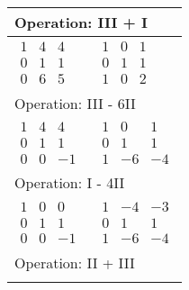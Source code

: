 \begin{longtable}{p{4cm}|p{3cm}}
    \multicolumn{2}{p{\dimexpr4cm+3cm+2\tabcolsep\relax}}{Operation: III + I} \\\hline\pagebreak[0]

    $\displaystyle\begin{matrix}
        1 & 4 & 4 \\
        0 & 1 & 1 \\
        0 & 6 & 5
    \end{matrix}$&
    $\displaystyle\begin{matrix}
        1 & 0 & 1 \\
        0 & 1 & 1 \\
        1 & 0 & 2
    \end{matrix}$\\\hline

    \multicolumn{2}{p{\dimexpr4cm+3cm+2\tabcolsep\relax}}{Operation: III - 6II} \\\hline\pagebreak[0]

    $\displaystyle\begin{matrix}
        1 & 4 & 4 \\
        0 & 1 & 1 \\
        0 & 0 & -1
    \end{matrix}$&
    $\displaystyle\begin{matrix}
        1 & 0 & 1 \\
        0 & 1 & 1 \\
        1 & -6 & -4
    \end{matrix}$\\\hline

    \multicolumn{2}{p{\dimexpr4cm+3cm+2\tabcolsep\relax}}{Operation: I - 4II} \\\hline\pagebreak[0]

    $\displaystyle\begin{matrix}
        1 & 0 & 0 \\
        0 & 1 & 1 \\
        0 & 0 & -1
    \end{matrix}$&
    $\displaystyle\begin{matrix}
        1 & -4 & -3 \\
        0 & 1 & 1 \\
        1 & -6 & -4
    \end{matrix}$\\\hline

    \multicolumn{2}{p{\dimexpr4cm+3cm+2\tabcolsep\relax}}{Operation: II + III} \\\hline\pagebreak[0]


\end{longtable}
